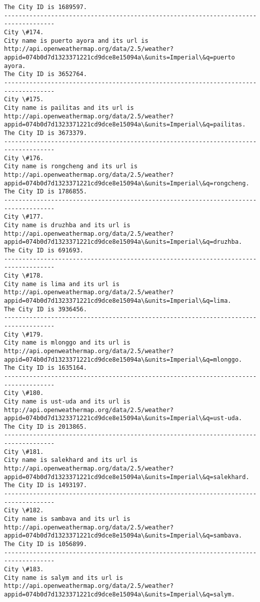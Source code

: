 \documentclass[11pt]{article}
\begin{document}
\begin{Verbatim}[commandchars=\\\{\}]
The City ID is 1689597.
------------------------------------------------------------------------------------
City \#174.
City name is puerto ayora and its url is http://api.openweathermap.org/data/2.5/weather?appid=074b0d7d1323371221cd9dce8e15094a\&units=Imperial\&q=puerto ayora.
The City ID is 3652764.
------------------------------------------------------------------------------------
City \#175.
City name is pailitas and its url is http://api.openweathermap.org/data/2.5/weather?appid=074b0d7d1323371221cd9dce8e15094a\&units=Imperial\&q=pailitas.
The City ID is 3673379.
------------------------------------------------------------------------------------
City \#176.
City name is rongcheng and its url is http://api.openweathermap.org/data/2.5/weather?appid=074b0d7d1323371221cd9dce8e15094a\&units=Imperial\&q=rongcheng.
The City ID is 1786855.
------------------------------------------------------------------------------------
City \#177.
City name is druzhba and its url is http://api.openweathermap.org/data/2.5/weather?appid=074b0d7d1323371221cd9dce8e15094a\&units=Imperial\&q=druzhba.
The City ID is 691693.
------------------------------------------------------------------------------------
City \#178.
City name is lima and its url is http://api.openweathermap.org/data/2.5/weather?appid=074b0d7d1323371221cd9dce8e15094a\&units=Imperial\&q=lima.
The City ID is 3936456.
------------------------------------------------------------------------------------
City \#179.
City name is mlonggo and its url is http://api.openweathermap.org/data/2.5/weather?appid=074b0d7d1323371221cd9dce8e15094a\&units=Imperial\&q=mlonggo.
The City ID is 1635164.
------------------------------------------------------------------------------------
City \#180.
City name is ust-uda and its url is http://api.openweathermap.org/data/2.5/weather?appid=074b0d7d1323371221cd9dce8e15094a\&units=Imperial\&q=ust-uda.
The City ID is 2013865.
------------------------------------------------------------------------------------
City \#181.
City name is salekhard and its url is http://api.openweathermap.org/data/2.5/weather?appid=074b0d7d1323371221cd9dce8e15094a\&units=Imperial\&q=salekhard.
The City ID is 1493197.
------------------------------------------------------------------------------------
City \#182.
City name is sambava and its url is http://api.openweathermap.org/data/2.5/weather?appid=074b0d7d1323371221cd9dce8e15094a\&units=Imperial\&q=sambava.
The City ID is 1056899.
------------------------------------------------------------------------------------
City \#183.
City name is salym and its url is http://api.openweathermap.org/data/2.5/weather?appid=074b0d7d1323371221cd9dce8e15094a\&units=Imperial\&q=salym.

\end{Verbatim}
\end{document}

